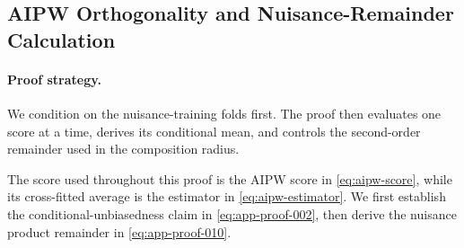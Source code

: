 \documentclass[11pt]{article}
\numberwithin{equation}{section}
\newcommand{\1}{\mathbf 1}
\begin{document}
\subsection{AIPW Orthogonality and Nuisance-Remainder Calculation}
\label{app:aipw-calculation}

\paragraph{Proof strategy.} We condition on the nuisance-training folds first.  The proof then evaluates one score at a time, derives its conditional mean, and controls the second-order remainder used in the composition radius.

The score used throughout this proof is the AIPW score in
\eqref{eq:aipw-score}, while its cross-fitted average is the estimator in
\eqref{eq:aipw-estimator}.  We first establish the conditional-unbiasedness
claim in \eqref{eq:app-proof-002}, then derive the nuisance product remainder
in \eqref{eq:app-proof-010}.
\end{document}
